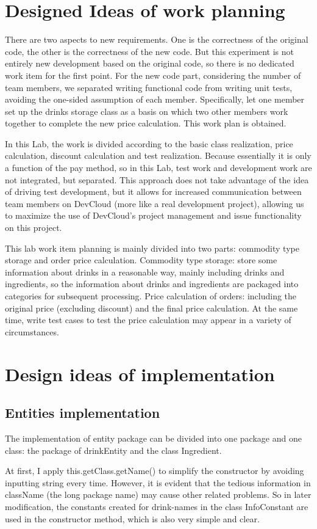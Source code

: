 \documentclass[a4paper]{report}
\begin{document}
\chapter{Designed Ideas of work planning}
% 

There are two aspects to new requirements. One is the correctness of the original code, the other is the correctness of the new code. But this experiment is not entirely new development based on the original code, so there is no dedicated work item for the first point. For the new code part, considering the number of team members, we separated writing functional code from writing unit tests, avoiding the one-sided assumption of each member. Specifically, let one member set up the drinks storage class as a basis on which two other members work together to complete the new price calculation. This work plan is obtained.
\par

In this Lab, the work is divided according to the basic class realization, price calculation, discount calculation and test realization. Because essentially it is only a function of the pay method, so in this Lab, test work and development work are not integrated, but separated. This approach does not take advantage of the idea of driving test development, but it allows for increased communication between team members on DevCloud (more like a real development project), allowing us to maximize the use of DevCloud's project management and issue functionality on this project.

\par

This lab work item planning is mainly divided into two parts: commodity type storage and order price calculation. Commodity type storage: store some information about drinks in a reasonable way, mainly including drinks and ingredients, so the information about drinks and ingredients are packaged into categories for subsequent processing. Price calculation of orders: including the original price (excluding discount) and the final price calculation. At the same time, write test cases to test the price calculation may appear in a variety of circumstances.



\chapter{Design ideas of implementation}
\section{Entities implementation}
The implementation of entity package can be divided into one package and one class: the package of drinkEntity and the class Ingredient.
\par At first, I apply this.getClass.getName() to simplify the constructor by avoiding inputting string every time. However, it is evident that the tedious information in className (the long package name) may cause other related problems. So in later modification, the constants created for drink-names in the class InfoConstant are used in the constructor method, which is also very simple and clear.
\end{document}
